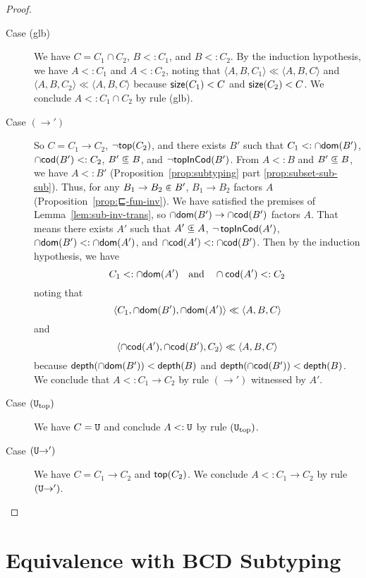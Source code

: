 \documentclass{article}
\begin{document}
\begin{proof}
\begin{description}
  \item[Case (glb)] We have $C = C_1 \cap C_2$, $B <: C_1$, and $B <:
    C_2$.  By the induction hypothesis, we have $A <: C_1$ and $A <:
    C_2$, noting that $\langle A, B, C_1 \rangle \ll \langle A, B, C
    \rangle$ and $\langle A, B, C_2 \rangle \ll \langle A, B, C\rangle$
    because $\mathsf{size}(C_1) < C$ and $\mathsf{size}(C_2) < C$.
    We conclude $A <: C_1 \cap C_2$ by rule (glb).
  \item[Case $(\to')$] So $C = C_1 \to C_2$, $\neg \mathsf{top}(C_2)$, and
    there exists $B'$ such that $C_1 <: \cap\mathsf{dom}(B')$, $\cap\mathsf{cod}(B') <: C_2$,
    $B' \subsetpluseq B$, and $\neg \mathsf{topInCod}(B')$. From $A <: B$ and $B' \subsetpluseq B$, we
    have $A <: B'$ (Proposition~\ref{prop:subtyping} part
    \ref{prop:subset-sub-sub}). Thus, for any $B_1 \to B_2 \inplus B'$,
    $B_1 \to B_2$ factors $A$ (Proposition~\ref{prop:⊑-fun-inv}). We
    have satisfied the premises of Lemma~\ref{lem:sub-inv-trans}, so
    $\cap\mathsf{dom}(B') \to \cap\mathsf{cod}(B')$ factors $A$. That means there exists $A'$
    such that $A' \subsetpluseq A$, $\neg\,\mathsf{topInCod}(A')$, $\cap\mathsf{dom}(B') <: \cap\mathsf{dom}(A')$,
    and $\cap\mathsf{cod}(A') <: \cap\mathsf{cod}(B')$. Then by the induction hypothesis, we
    have
    \[
    C_1 <: \cap\mathsf{dom}(A') \quad\text{and}\quad \cap\mathsf{cod}(A') <: C_2
    \]
    noting that
    \[
    \langle C_1, \cap\mathsf{dom}(B'), \cap\mathsf{dom}(A') \rangle \ll \langle A, B, C \rangle
    \]
    and
    \[
    \langle \cap\mathsf{cod}(A'), \cap\mathsf{cod}(B'), C_2 \rangle \ll \langle A, B, C \rangle
    \]
    because $\mathsf{depth}(\cap\mathsf{dom}(B')) < \mathsf{depth}(B)$
    and $\mathsf{depth}(\cap\mathsf{cod}(B')) < \mathsf{depth}(B)$.
    We conclude that $A <: C_1 \to C_2$ by rule $(\to')$ witnessed by $A'$.
  \item[Case $(\mathtt{U}_{\mathrm{top}})$] We have $C = \mathtt{U}$ and
    conclude $A <: \mathtt{U}$ by rule $(\mathtt{U}_{\mathrm{top}})$.
  \item[Case $(\mathtt{U}{\to}')$] We have $C = C_1 \to C_2$ and $\mathsf{top}(C_2)$.
    We conclude $A <: C_1 \to C_2$ by rule $(\mathtt{U}{\to}')$.
  \end{description}
\end{proof}


\section{Equivalence with BCD Subtyping}
\label{sec:equiv}
\end{document}
